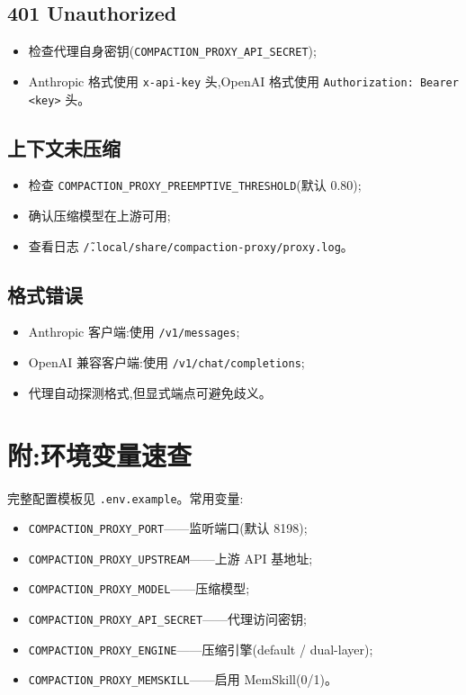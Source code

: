 \documentclass[11pt,a4paper]{article}
\begin{document}
\subsection{401 Unauthorized}

\begin{itemize}
  \item 检查代理自身密钥(\texttt{COMPACTION\_PROXY\_API\_SECRET});
  \item Anthropic 格式使用 \texttt{x-api-key} 头,OpenAI 格式使用
        \texttt{Authorization: Bearer <key>} 头。
\end{itemize}

\subsection{上下文未压缩}

\begin{itemize}
  \item 检查 \texttt{COMPACTION\_PROXY\_PREEMPTIVE\_THRESHOLD}(默认 0.80);
  \item 确认压缩模型在上游可用;
  \item 查看日志 \texttt{\~/.local/share/compaction-proxy/proxy.log}。
\end{itemize}

\subsection{格式错误}

\begin{itemize}
  \item Anthropic 客户端:使用 \texttt{/v1/messages};
  \item OpenAI 兼容客户端:使用 \texttt{/v1/chat/completions};
  \item 代理自动探测格式,但显式端点可避免歧义。
\end{itemize}

\section*{附:环境变量速查}

完整配置模板见 \texttt{.env.example}。常用变量:

\begin{itemize}
  \item \texttt{COMPACTION\_PROXY\_PORT}——监听端口(默认 8198);
  \item \texttt{COMPACTION\_PROXY\_UPSTREAM}——上游 API 基地址;
  \item \texttt{COMPACTION\_PROXY\_MODEL}——压缩模型;
  \item \texttt{COMPACTION\_PROXY\_API\_SECRET}——代理访问密钥;
  \item \texttt{COMPACTION\_PROXY\_ENGINE}——压缩引擎(default / dual-layer);
  \item \texttt{COMPACTION\_PROXY\_MEMSKILL}——启用 MemSkill(0/1)。
\end{itemize}
\end{document}
